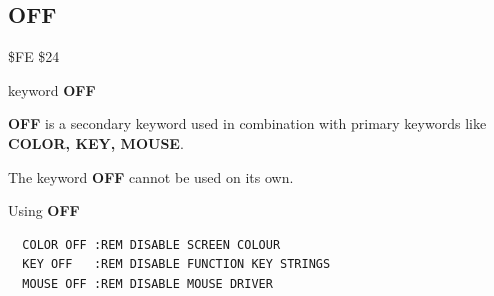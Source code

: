 \subsection{OFF}
\begin{description}[leftmargin=2cm,style=nextline]
\item [Token:] \$FE \$24
\item [Format:] keyword {\bf OFF}
\item [Usage:]  {\bf OFF} is a secondary keyword used in
                combination with primary keywords like
                {\bf COLOR, KEY, MOUSE}.

\item [Remarks:] The keyword {\bf OFF} cannot be used on its own.

\item [Example:] Using {\bf OFF}

\begin{tcolorbox}[colback=black,coltext=white]
\verbatimfont{\codefont}
\begin{verbatim}
  COLOR OFF :REM DISABLE SCREEN COLOUR
  KEY OFF   :REM DISABLE FUNCTION KEY STRINGS
  MOUSE OFF :REM DISABLE MOUSE DRIVER
\end{verbatim}
\end{tcolorbox}
\end{description}


\newpage
